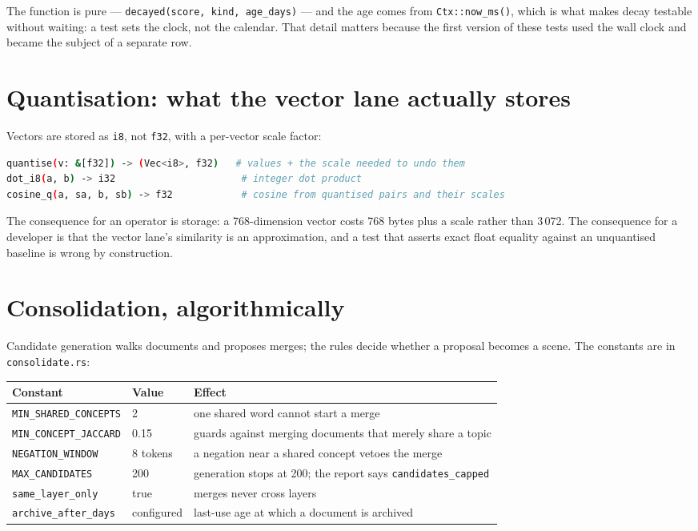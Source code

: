 The function is pure --- \texttt{decayed(score, kind, age\_days)} --- and the age comes from
\texttt{Ctx::now\_ms()}, which is what makes decay testable without waiting: a test sets the clock,
not the calendar. That detail matters because the first version of these tests used the wall clock
and became the subject of a separate row.

\section{Quantisation: what the vector lane actually stores}

Vectors are stored as \texttt{i8}, not \texttt{f32}, with a per-vector scale factor:

\begin{lstlisting}[language=bash]
quantise(v: &[f32]) -> (Vec<i8>, f32)   # values + the scale needed to undo them
dot_i8(a, b) -> i32                      # integer dot product
cosine_q(a, sa, b, sb) -> f32            # cosine from quantised pairs and their scales
\end{lstlisting}

The consequence for an operator is storage: a 768-dimension vector costs 768 bytes plus a scale
rather than 3\,072. The consequence for a developer is that the vector lane's similarity is an
approximation, and a test that asserts exact float equality against an unquantised baseline is
wrong by construction.

\section{Consolidation, algorithmically}

Candidate generation walks documents and proposes merges; the rules decide whether a proposal
becomes a scene. The constants are in \texttt{consolidate.rs}:

\begin{longtable}{@{}p{}p{}p{}@{}}
  \toprule
  \textbf{Constant} & \textbf{Value} & \textbf{Effect} \\
  \midrule
  \endhead
  \texttt{MIN\_SHARED\_CONCEPTS} & 2 & one shared word cannot start a merge \\
  \texttt{MIN\_CONCEPT\_JACCARD} & 0.15 & guards against merging documents that merely share a topic \\
  \texttt{NEGATION\_WINDOW} & 8 tokens & a negation near a shared concept vetoes the merge \\
  \texttt{MAX\_CANDIDATES} & 200 & generation stops at 200; the report says \texttt{candidates\_capped} \\
  \texttt{same\_layer\_only} & true & merges never cross layers \\
  \texttt{archive\_after\_days} & configured & last-use age at which a document is archived \\
  \bottomrule
\end{longtable}

